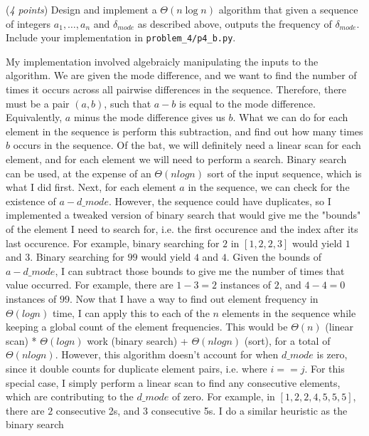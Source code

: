 \documentclass{hw_template}
\begin{document}
\begin{problem}
  \begin{subproblem}
    (\textit{4 points})
    Design and implement a $\Theta(n \log n)$ algorithm that given a sequence of integers $a_1,\ldots,a_n$ and $\delta_{mode}$ as described above, outputs the frequency of $\delta_{mode}$. Include your implementation in \texttt{problem\_4/p4\_b.py}.
  \end{subproblem}
    \begin{solution}
        My implementation involved algebraicly manipulating the inputs to the algorithm. We are given the mode difference, and we want to find the number of times it occurs across all pairwise differences in the sequence. Therefore, there must be
        a pair $(a,b)$, such that $a - b$ is equal to the mode difference. Equivalently, $a$ minus the mode difference gives us $b$. What we can do for each element in the sequence is perform this subtraction, and find 
        out how many times $b$ occurs in the sequence. Of the bat, we will definitely need a linear scan for each element, and for each element we will need to perform a search. Binary search can be used, at the expense of an 
        $\Theta(nlogn)$ sort of the input sequence, which is what I did first. Next, for each element $a$ in the sequence, we can check for the existence of $a - d\_mode$. However, the sequence could have duplicates, so I implemented 
        a tweaked version of binary search that would give me the "bounds" of the element I need to search for, i.e. the first occurence and the index after its last occurence. For example, binary searching for $2$ in $[1, 2, 2, 3]$ 
        would yield $1$ and $3$. Binary searching for $99$ would yield $4$ and $4$. Given the bounds of $a - d\_mode$, I can subtract those bounds to give me the number of times that value occurred. For example, there are $1-3=2$ instances 
        of $2$, and $4-4=0$ instances of $99$. Now that I have a way to find out element frequency in $\Theta(logn)$ time, I can apply this to each of the $n$ elements in the sequence while keeping a global count of the element frequencies.
        This would be $\Theta(n)$ (linear scan) * $\Theta(logn)$ work (binary search) + $\Theta(nlogn)$ (sort), for a total
        of $\Theta(nlogn)$. However, this algorithm doesn't account for when $d\_mode$ is zero, since it double counts for duplicate element pairs, i.e. where $i==j$. For this special case, I simply perform a linear scan to find any 
        consecutive elements, which are contributing to the $d\_mode$ of zero. For example, in $[1, 2, 2, 4, 5, 5, 5]$, there are $2$ consecutive 2s, and $3$ consecutive 5s. I do a similar heuristic as the binary search 

\end{solution}
\end{problem}
\end{document}
